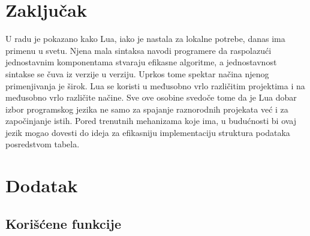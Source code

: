 \documentclass[a4paper]{article}
\begin{document}

\section{Zaključak}
\label{sec:zakljucak}

U radu je pokazano kako Lua, iako je nastala za lokalne potrebe, danas ima primenu u svetu. Njena mala sintaksa navodi programere da raspolazući jednostavnim komponentama stvaraju efikasne algoritme, a jednostavnost sintakse se čuva iz verzije u verziju. Uprkos tome spektar načina njenog primenjivanja je širok. Lua se koristi u međusobno vrlo različitim projektima i na međusobno vrlo različite načine. Sve ove osobine svedoče tome da je Lua dobar izbor programskog jezika ne samo za spajanje raznorodnih projekata već i za započinjanje istih. Pored trenutnih mehanizama koje ima, u budućnosti bi ovaj jezik mogao dovesti do ideja za efikasniju implementaciju struktura podataka posredstvom tabela.

\appendix
 


\appendix
\section{Dodatak}
\subsection{Korišćene funkcije}
\label{dodaci}
\end{document}

